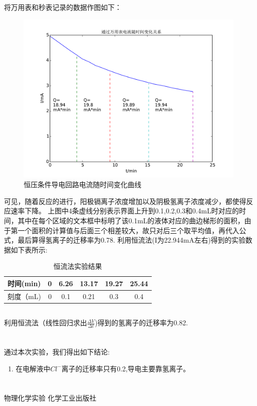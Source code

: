 ﻿\documentclass[10.5pt]{article}
\begin{document}
\subsection{\textbf{}}
将万用表和秒表记录的数据作图如下：
\begin{figure}[!ht]
\centering
\caption{恒压条件导电回路电流随时间变化曲线}
\includegraphics[width=400pt]{pc_2.pdf}
\end{figure}
可见，随着反应的进行，阳极镉离子浓度增加以及阴极氢离子浓度减少，都使得反应速率下降。
上图中4条虚线分别表示界面上升到0.1,0.2,0.3和0.4mL时对应的时间，其中在每个区域的文本框中标明了该0.1mL的液体对应的曲边梯形的面积，由于第一个面积的计算值与后面三个相差较大，故只对后三个取平均值，再代入公式，最后算得氢离子的迁移率为0.78.
利用恒流法(I为22.944mA左右)得到的实验数据如下表所示:
\begin{table}[!ht]
\centering
\caption{恒流法实验结果}
\begin{tabular}{cccccc}
\hline
时间(min) & 0 & 6.26 & 13.17 & 19.27 & 25.44  \\
\hline
刻度（mL) & 0 & 0.1 & 0.21 & 0.3 & 0.4\\
\hline
\end{tabular}
\end{table}

\subsection{\textbf{}}
利用恒流法（线性回归求出$\frac{\Delta V}{\Delta t}$)得到的氢离子的迁移率为0.82.



\section{\textbf{}}

通过本次实验，我们得出如下结论:
\begin{enumerate}
\item 在电解液中$Cl^-$离子的迁移率只有0.2,导电主要靠氢离子。
\end{enumerate}

\section{\textbf{}}
\begin{thebibliography}{}
物理化学实验 \quad 化学工业出版社
\end{thebibliography}
\end{document}
